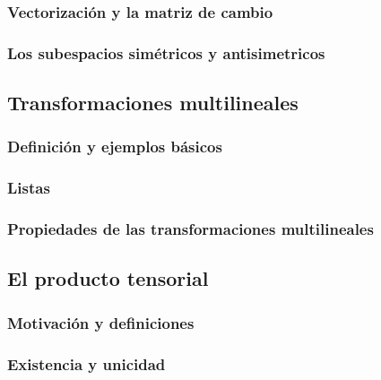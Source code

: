 \subsubsection{Vectorización y la matriz de cambio} %
\label{ssub:vectorizacion_y_la_matriz_de_cambio}

\subsubsection{Los subespacios simétricos y antisimetricos} %
\label{ssub:los_subespacios_simetricos_y_antisimetricos}

\subsection{Transformaciones multilineales} %
\label{sub:transformaciones_multilineales}

\subsubsection{Definición y ejemplos básicos} %
\label{ssub:definicion_y_ejemplos_basicos}

\subsubsection{Listas} %
\label{ssub:listas}

\subsubsection{Propiedades de las transformaciones multilineales} %
\label{ssub:propiedades_de_las_transformaciones_multilineales}

\subsection{El producto tensorial} %
\label{sub:el_producto_tensorial}

\subsubsection{Motivación y definiciones} %
\label{ssub:motivacion_y_definiciones}

\subsubsection{Existencia y unicidad} %
\label{ssub:existencia_y_unicidad}

